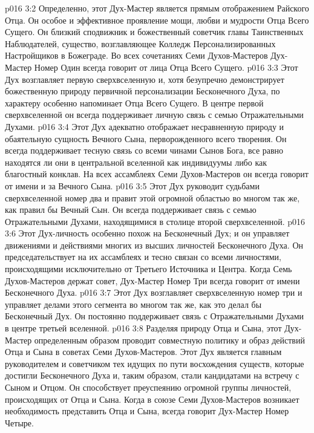 \vs p016 3:2  Определенно, этот Дух\hyp{}Мастер является прямым отображением Райского Отца. Он особое и эффективное проявление мощи, любви и мудрости Отца Всего Сущего. Он близкий сподвижник и божественный советчик главы Таинственных Наблюдателей, существо, возглавляющее Колледж Персонализированных Настройщиков в Божеграде. Во всех сочетаниях Семи Духов\hyp{}Мастеров Дух\hyp{}Мастер Номер Один всегда говорит от лица Отца Всего Сущего.
\vs p016 3:3 Этот Дух возглавляет первую сверхвселенную и, хотя безупречно демонстрирует божественную природу первичной персонализации Бесконечного Духа, по характеру особенно напоминает Отца Всего Сущего. В центре первой сверхвселенной он всегда поддерживает личную связь с семью Отражательными Духами.
\vs p016 3:4 \pc {} Этот Дух адекватно отображает несравненную природу и обаятельную сущность Вечного Сына, перворожденного всего творения. Он всегда поддерживает тесную связь со всеми чинами Сынов Бога, все равно находятся ли они в центральной вселенной как индивидуумы либо как благостный конклав. На всех ассамблеях Семи Духов\hyp{}Мастеров он всегда говорит от имени и за Вечного Сына.
\vs p016 3:5 Этот Дух руководит судьбами сверхвселенной номер два и правит этой огромной областью во многом так же, как правил бы Вечный Сын. Он всегда поддерживает связь с семью Отражательными Духами, находящимися в столице второй сверхвселенной.
\vs p016 3:6 \pc {} Этот Дух\hyp{}личность особенно похож на Бесконечный Дух; и он управляет движениями и действиями многих из высших личностей Бесконечного Духа. Он председательствует на их ассамблеях и тесно связан со всеми личностями, происходящими исключительно от Третьего Источника и Центра. Когда Семь Духов\hyp{}Мастеров держат совет, Дух\hyp{}Мастер Номер Три всегда говорит от имени Бесконечного Духа.
\vs p016 3:7 Этот Дух возглавляет сверхвселенную номер три и управляет делами этого сегмента во многом так же, как это делал бы Бесконечный Дух. Он постоянно поддерживает связь с Отражательными Духами в центре третьей вселенной.
\vs p016 3:8 \pc {} Разделяя природу Отца и Сына, этот Дух\hyp{}Мастер определенным образом проводит совместную политику и образ действий Отца и Сына в советах Семи Духов\hyp{}Мастеров. Этот Дух является главным руководителем и советчиком тех идущих по пути восхождения существ, которые достигли Бесконечного Духа и, таким образом, стали кандидатами на встречу с Сыном и Отцом. Он способствует преуспеянию огромной группы личностей, происходящих от Отца и Сына. Когда в союзе Семи Духов\hyp{}Мастеров возникает необходимость представить Отца и Сына, всегда говорит Дух\hyp{}Мастер Номер Четыре.
